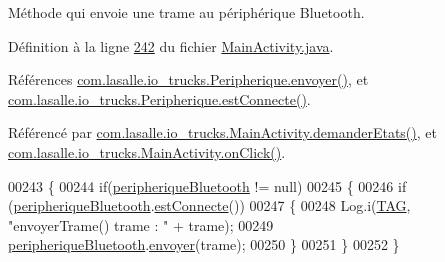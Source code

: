 Méthode qui envoie une trame au périphérique Bluetooth. 



Définition à la ligne \hyperlink{_main_activity_8java_source_l00242}{242} du fichier \hyperlink{_main_activity_8java_source}{Main\+Activity.\+java}.



Références \hyperlink{_peripherique_8java_source_l00149}{com.\+lasalle.\+io\+\_\+trucks.\+Peripherique.\+envoyer()}, et \hyperlink{_peripherique_8java_source_l00122}{com.\+lasalle.\+io\+\_\+trucks.\+Peripherique.\+est\+Connecte()}.



Référencé par \hyperlink{_main_activity_8java_source_l00438}{com.\+lasalle.\+io\+\_\+trucks.\+Main\+Activity.\+demander\+Etats()}, et \hyperlink{_main_activity_8java_source_l00131}{com.\+lasalle.\+io\+\_\+trucks.\+Main\+Activity.\+on\+Click()}.


\begin{DoxyCode}
00243     \{
00244         \textcolor{keywordflow}{if}(\hyperlink{classcom_1_1lasalle_1_1io__trucks_1_1_main_activity_a0c0b8e9294fa6c74c52886cb50687f18}{peripheriqueBluetooth} != null)
00245         \{
00246             \textcolor{keywordflow}{if} (\hyperlink{classcom_1_1lasalle_1_1io__trucks_1_1_main_activity_a0c0b8e9294fa6c74c52886cb50687f18}{peripheriqueBluetooth}.\hyperlink{classcom_1_1lasalle_1_1io__trucks_1_1_peripherique_a53878a13cdb7b3d8fa8e7c97cb0287f0}{estConnecte}())
00247             \{
00248                 Log.i(\hyperlink{classcom_1_1lasalle_1_1io__trucks_1_1_main_activity_a37b90dba972711328e3f4c83c55eb0fc}{TAG}, \textcolor{stringliteral}{"envoyerTrame() trame : "} + trame);
00249                 \hyperlink{classcom_1_1lasalle_1_1io__trucks_1_1_main_activity_a0c0b8e9294fa6c74c52886cb50687f18}{peripheriqueBluetooth}.\hyperlink{classcom_1_1lasalle_1_1io__trucks_1_1_peripherique_a7f691381f5164b92f8ff3f06561db656}{envoyer}(trame);
00250             \}
00251         \}
00252     \}
\end{DoxyCode}
\mbox{\label{classcom_1_1lasalle_1_1io__trucks_1_1_main_activity_a6c15e67f7d99f62d1e40de710216a1d7}} 
